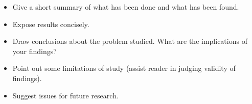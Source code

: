 
\begin{itemize}

    \item Give a short summary of what has been done and what has been
    found.

    \item Expose results concisely.

    \item Draw conclusions about the problem studied. What are the
    implications of your findings?

    \item Point out some limitations of study (assist reader in judging validity
    of findings).

    \item Suggest issues for future research.

\end{itemize}
